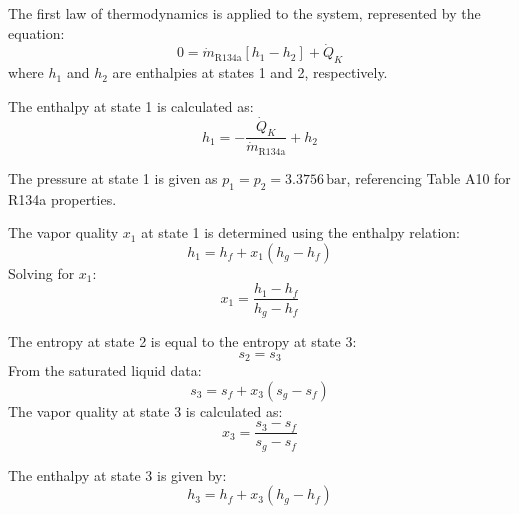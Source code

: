 The first law of thermodynamics is applied to the system, represented by the equation:  
\[
0 = \dot{m}_{\text{R134a}} \left[ h_1 - h_2 \right] + \dot{Q}_K
\]  
where \( h_1 \) and \( h_2 \) are enthalpies at states 1 and 2, respectively.  

The enthalpy at state 1 is calculated as:  
\[
h_1 = -\frac{\dot{Q}_K}{\dot{m}_{\text{R134a}}} + h_2
\]  

The pressure at state 1 is given as \( p_1 = p_2 = 3.3756 \, \text{bar} \), referencing Table A10 for R134a properties.  

The vapor quality \( x_1 \) at state 1 is determined using the enthalpy relation:  
\[
h_1 = h_f + x_1 \left( h_g - h_f \right)
\]  
Solving for \( x_1 \):  
\[
x_1 = \frac{h_1 - h_f}{h_g - h_f}
\]

The entropy at state 2 is equal to the entropy at state 3:  
\[
s_2 = s_3
\]  
From the saturated liquid data:  
\[
s_3 = s_f + x_3 (s_g - s_f)
\]  
The vapor quality at state 3 is calculated as:  
\[
x_3 = \frac{s_3 - s_f}{s_g - s_f}
\]  

The enthalpy at state 3 is given by:  
\[
h_3 = h_f + x_3 (h_g - h_f)
\]